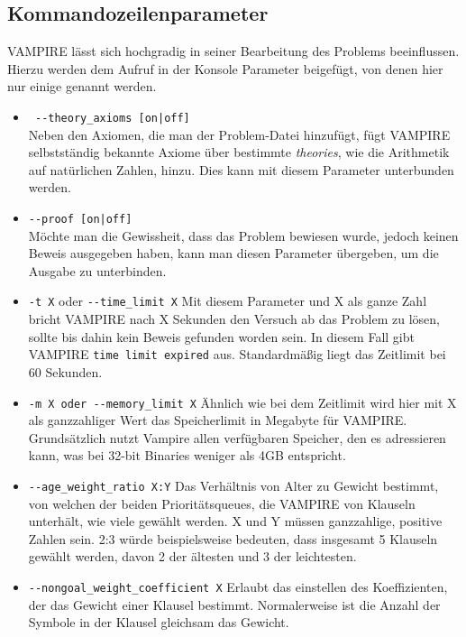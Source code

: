 \documentclass{article}
\begin{document}
\subsection{Kommandozeilenparameter}
\label{subsec:commands}
VAMPIRE lässt sich hochgradig in seiner Bearbeitung des Problems beeinflussen. Hierzu werden dem Aufruf in der Konsole Parameter beigefügt, von denen hier nur einige genannt werden.
\begin{itemize}
	\item \verb= --theory_axioms [on|off]= \label{arg:theoryaxiomsoff}\\
	Neben den Axiomen, die man der Problem-Datei hinzufügt, fügt VAMPIRE selbstständig bekannte 
	Axiome über bestimmte \emph{theories}, wie die Arithmetik auf natürlichen Zahlen, hinzu. 
	Dies kann mit diesem Parameter unterbunden werden.
	\item \verb=--proof [on|off]= \label{arg:proofoff}\\
	Möchte man die Gewissheit, dass das Problem bewiesen wurde, jedoch keinen Beweis ausgegeben haben, kann man diesen Parameter übergeben, um die Ausgabe zu unterbinden.

\item \verb|-t X| oder \verb|--time_limit X| \label{arg:timelimit}
Mit diesem Parameter und X als ganze Zahl bricht VAMPIRE nach X Sekunden den Versuch ab das Problem zu lösen, sollte bis dahin kein Beweis gefunden worden sein.
In diesem Fall gibt VAMPIRE \texttt{time limit expired} aus. Standardmäßig liegt das Zeitlimit bei 60  Sekunden.

\item \verb|-m X oder --memory_limit X| \label{arg:memorylimit}
Ähnlich wie bei dem Zeitlimit wird hier mit X als ganzzahliger Wert das Speicherlimit in Megabyte für VAMPIRE. Grundsätzlich nutzt Vampire allen verfügbaren Speicher, den es adressieren kann, was bei 32-bit Binaries weniger als 4GB entspricht.

\item \verb|--age_weight_ratio X:Y| \label{arg:ageweightratio}
Das Verhältnis von Alter zu Gewicht bestimmt, von welchen der beiden Prioritätsqueues, die VAMPIRE von Klauseln unterhält, wie viele gewählt werden. X und Y müssen ganzzahlige, positive Zahlen sein.
2:3 würde beispielsweise bedeuten, dass insgesamt 5 Klauseln gewählt werden, davon 2 der ältesten und 3 der leichtesten. 

\item \verb|--nongoal_weight_coefficient X| \label{arg:weightcoefficient}
Erlaubt das einstellen des Koeffizienten, der das Gewicht einer Klausel bestimmt. Normalerweise ist die Anzahl der Symbole in der Klausel gleichsam das Gewicht.


\end{itemize}
\end{document}
